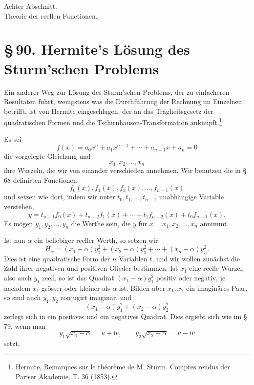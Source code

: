 \documentclass[11pt]{article}
\providecommand{\sect}[2]{\section*{\S\,#1. #2}}
\providecommand{\ii}{\mathrm{i}}
\begin{document}
\begin{center}
{\large Achter Abschnitt.}\\[0.6em]
{\Large Theorie der reellen Functionen.}
\end{center}

\sect{90}{Hermite's Lösung des Sturm'schen Problems}

Ein anderer Weg zur Lösung des Sturm'schen Problems, der zu einfacheren Resultaten führt, wenigstens was die Durchführung der Rechnung im Einzelnen betrifft, ist von Hermite eingeschlagen, der an das Trägheitsgesetz der quadratischen Formen und die Tschirnhausen-Transformation anknüpft.\footnote{Hermite, Remarques sur le théorème de M. Sturm. Comptes rendus der Pariser Akademie, T. 36 (1853).}

Es sei
\begin{equation}
f(x)=a_0x^n+a_1x^{n-1}+\cdots+a_{n-1}x+a_n=0
\tag{1}
\end{equation}
die vorgelegte Gleichung und
\begin{equation}
x_1,x_2,\ldots,x_n
\tag{2}
\end{equation}
ihre Wurzeln, die wir von einander verschieden annehmen. Wir benutzen die in \S\,68 definirten Functionen
\begin{equation}
f_0(x),f_1(x),f_2(x),\ldots,f_{n-1}(x)
\tag{3}
\end{equation}
und setzen wie dort, indem wir unter $t_0,t_1,\ldots,t_{n-1}$ unabhängige Variable verstehen,
\begin{equation}
y=t_{n-1}f_0(x)+t_{n-2}f_1(x)+\cdots+t_1f_{n-2}(x)+t_0f_{n-1}(x).
\tag{4}
\end{equation}
Es mögen $y_1,y_2,\ldots,y_n$ die Werthe sein, die $y$ für $x=x_1,x_2,\ldots,x_n$ annimmt.

Ist nun $\alpha$ ein beliebiger reeller Werth, so setzen wir
\begin{equation}
H_\alpha=(x_1-\alpha)y_1^2+(x_2-\alpha)y_2^2+\cdots+(x_n-\alpha)y_n^2.
\tag{5}
\end{equation}
Dies ist eine quadratische Form der $n$ Variablen $t$, und wir wollen zunächst die Zahl ihrer negativen und positiven Glieder bestimmen. Ist $x_1$ eine reelle Wurzel, also auch $y_1$ reell, so ist das Quadrat $(x_1-\alpha)y_1^2$ positiv oder negativ, je nachdem $x_1$ grösser oder kleiner als $\alpha$ ist. Bilden aber $x_1,x_2$ ein imaginäres Paar, so sind auch $y_1,y_2$ conjugirt imaginär, und
\[
        (x_1-\alpha)y_1^2+(x_2-\alpha)y_2^2
\]
zerlegt sich in ein positives und ein negatives Quadrat. Dies ergiebt sich wie im \S\,79, wenn man
\[
        y_1\sqrt{x_1-\alpha}=u+\ii v,
        \qquad
        y_2\sqrt{x_2-\alpha}=u-\ii v
\]
setzt.
\end{document}
